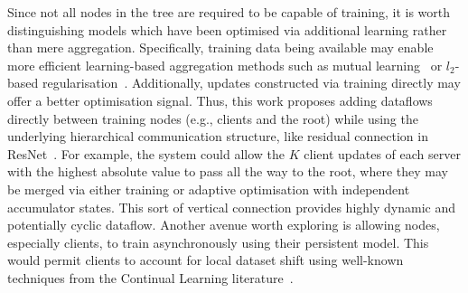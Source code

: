 Since not all nodes in the tree are required to be capable of training, it is worth distinguishing models which have been optimised via additional learning rather than mere aggregation. Specifically, training data being available may enable more efficient learning-based aggregation methods such as mutual learning~\citep{DeepMutualLearning} or $l_2$-based regularisation~\citep{Ditto}. Additionally, updates constructed via training directly may offer a better optimisation signal. Thus, this work proposes adding dataflows directly between training nodes (e.g., clients and the root) while using the underlying hierarchical communication structure, like residual connection in ResNet~\citep{ResNet}. For example, the system could allow the $K$ client updates of each server with the highest absolute value to pass all the way to the root, where they may be merged via either training or adaptive optimisation with independent accumulator states. This sort of vertical connection provides highly dynamic and potentially cyclic dataflow. Another avenue worth exploring is allowing nodes, especially clients, to train asynchronously using their persistent model. This would permit clients to account for local dataset shift using well-known techniques from the Continual Learning literature~\citep{ContinualLearningSurvey,LearningWithoutForgetting,kirkpatrick2017overcoming}.


